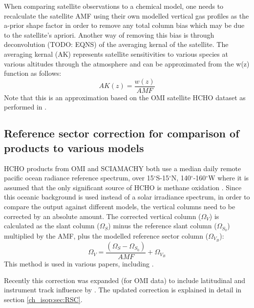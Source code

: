     When comparing satellite observations to a chemical model, one needs to recalculate the satellite AMF using their own modelled vertical gas profiles as the a-prior shape factor in order to remove any total column bias which may be due to the satellite's apriori.
    Another way of removing this bias is through deconvolution (TODO: EQNS) of the averaging kernal of the satellite.
    The averaging kernal (AK) represents satellite sensitivities to various species at various altitudes through the atmosphere and can be approximated from the w(z) function as follows:
    \begin{equation} \label{ch_isop:eqn:AKfromw}
      AK(z) = \frac{w(z)}{AMF}
    \end{equation}
    Note that this is an approximation based on the OMI satellite HCHO dataset as performed in \citet{Gonzalez2015}.
    
  \subsection{Reference sector correction for comparison of products to various models}
    HCHO products from OMI and SCIAMACHY both use a median daily remote pacific ocean radiance reference spectrum, over 15$^{\circ}$S-15$^{\circ}$N, 140$^{\circ}$-160$^{\circ}$W where it is assumed that the only significant source of HCHO is methane oxidation \citep{Desmedt2008,Barkley2013,OMI_README}.
    Since this oceanic background is used instead of a solar irradiance spectrum, in order to compare the output against different models, the vertical columns need to be corrected by an absolute amount.
    The corrected vertical column ($\Omega_V$) is calculated as the slant column ($\Omega_S$) minus the reference slant column ($\Omega_{S_0}$) multiplied by the AMF, plus the modelled reference sector column ($\Omega_{V_B}$):
    \begin{equation*}
      \Omega_V = \frac{ \left( \Omega_S - \Omega_{S_0} \right) }{ AMF } + \Omega_{V_B}
    \end{equation*}
    This method is used in various papers, including \citet{Desmedt2008, DeSmedt2012, DeSmedt2015, Barkley2013}.
    
    Recently this correction was expanded (for OMI data) to include latitudinal and instrument track influence by \citet{Abad2015}.
    The updated correction is explained in detail in section \ref{ch_isop:sec:RSC}.
    
